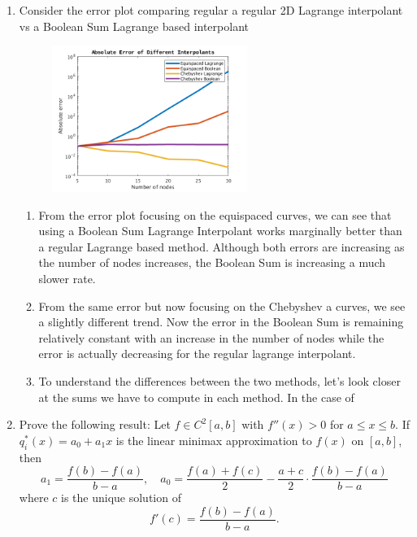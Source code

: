 \documentclass[a4paper,12pt]{article}
\begin{document}
\begin{enumerate}[label = \arabic*.]
	\item Consider the error plot comparing regular a regular 2D Lagrange interpolant vs a Boolean Sum Lagrange based interpolant
	\begin{figure}[h!]
		\centering
		\includegraphics[width = 0.6\textwidth]{images/Errors.png}
	\end{figure}
	\begin{enumerate}[label = (\alph*)]
		\item From the error plot focusing on the equispaced curves, we can see that using a Boolean Sum Lagrange Interpolant works marginally better than a regular Lagrange based method. Although both errors are increasing as the number of nodes increases, the Boolean Sum is increasing a much slower rate.
		
		\item From the same error but now focusing on the Chebyshev a curves, we see a slightly different trend. Now the error in the Boolean Sum is remaining relatively constant with an increase in the number of nodes while the error is actually decreasing for the regular lagrange interpolant.
		 
		\item To understand the differences between the two methods, let's look closer at the sums we have to compute in each method. In the case of 
	\end{enumerate}
	
	\item Prove the following result: Let $ f \in C^2 [a,b] $ with $ f''(x) > 0 $ for $ a \leq x \leq b $. If $ q_i^*(x) = a_0 + a_1 x $ is the linear minimax approximation to $ f(x) $ on $ [a,b] $, then 
	\[
		a_1 = \frac{f(b) - f(a)}{b - a}, \quad a_0 = \frac{f(a) + f(c)}{2} - \frac{a + c}{2} \cdot \frac{f(b) - f(a)}{b - a}
	\]
	where $ c $ is the unique solution of
	\[
		f'(c) = \frac{f(b) - f(a)}{b - a}.
	\]
	

\end{enumerate}
\end{document}
